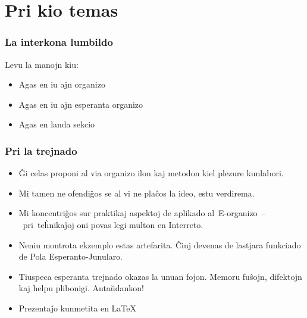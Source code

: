  
\section{Pri kio temas}

  \begin{frame}
    \frametitle{La interkona lumbildo}
    
    Levu la manojn kiu:

	\begin{itemize}
		
		\item<1-1> Agas en iu ajn organizo

		\item<2-2> Agas en iu ajn esperanta organizo
		
		\item<3-3> Agas en landa sekcio
				
	\end{itemize}
	
  \end{frame}



  \begin{frame}
    \frametitle{Pri la trejnado}

	
	\begin{itemize}

		\item<-1> Ĝi celas proponi al via organizo ilon kaj metodon kiel plezure kunlabori.
		
		\item<-1> Mi tamen ne ofendiĝos se al vi ne plaĉos la ideo, estu verdirema.
		
		\item<2-2> Mi koncentriĝos sur praktikaj aspektoj de aplikado al~E-organizo~--~pri~teĥnikaĵoj oni povas legi multon en Interreto.
	
		\item<2-2> Neniu montrota ekzemplo estas artefarita. Ĉiuj devenas de lastjara funkciado de Pola Esperanto-Junularo.
		
		\item<3-3> Tiuspeca esperanta trejnado okazas la unuan fojon. Memoru fuŝojn, difektojn kaj helpu plibonigi. Antaŭdankon!
				
		\item<3-3> Prezentaĵo kunmetita en \LaTeX
				
	\end{itemize}
  \end{frame}


